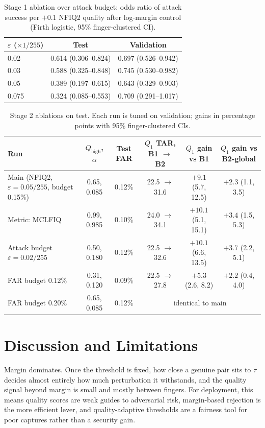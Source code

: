 \documentclass[10pt,twocolumn,letterpaper]{article}
\newcommand{\eps}{\varepsilon}
\begin{document}
\begin{table}[t]
\centering\footnotesize\setlength{\tabcolsep}{3pt}
\caption{Stage 1 ablation over attack budget: odds ratio of attack success per $+0.1$ NFIQ2 quality after log-margin control (Firth logistic, 95\% finger-clustered CI).}
\label{tab:epsabl}
\begin{tabular}{lcc}
\toprule
$\eps$ ($\times 1/255$) & Test & Validation \\
\midrule
0.02 & 0.614 (0.306--0.824) & 0.697 (0.526--0.942) \\
0.03 & 0.588 (0.325--0.848) & 0.745 (0.530--0.982) \\
0.05 & 0.389 (0.197--0.615) & 0.643 (0.329--0.903) \\
0.075 & 0.324 (0.085--0.553) & 0.709 (0.291--1.017) \\
\bottomrule
\end{tabular}
\end{table}

\begin{table}[t]
\centering\footnotesize
\caption{Stage 2 ablations on test. Each run is tuned on validation; gains in percentage points with 95\% finger-clustered CIs.}
\label{tab:abl}
\setlength{\tabcolsep}{4pt}
\begin{tabular}{lccccc}
\toprule
Run & $Q_{\mathrm{high}}$, $\alpha$ & Test FAR & $Q_1$ TAR, B1 $\to$ B2 & $Q_1$ gain vs B1 & $Q_1$ gain vs B2-global \\
\midrule
Main (NFIQ2, $\eps = 0.05/255$, budget 0.15\%) & 0.65, 0.085 & 0.12\% & 22.5 $\to$ 31.6 & $+9.1$ (5.7, 12.5) & $+2.3$ (1.1, 3.5) \\
Metric: MCLFIQ & 0.99, 0.985 & 0.10\% & 24.0 $\to$ 34.1 & $+10.1$ (5.1, 15.1) & $+3.4$ (1.5, 5.3) \\
Attack budget $\eps = 0.02/255$ & 0.50, 0.180 & 0.12\% & 22.5 $\to$ 32.6 & $+10.1$ (6.6, 13.5) & $+3.7$ (2.2, 5.1) \\
FAR budget 0.12\% & 0.31, 0.120 & 0.09\% & 22.5 $\to$ 27.8 & $+5.3$ (2.6, 8.2) & $+2.2$ (0.4, 4.0) \\
FAR budget 0.20\% & 0.65, 0.085 & 0.12\% & \multicolumn{3}{c}{identical to main} \\
\bottomrule
\end{tabular}
\end{table}

\section{Discussion and Limitations}
Margin dominates. Once the threshold is fixed, how close a genuine pair sits to $\tau$ decides almost entirely how much perturbation it withstands, and the quality signal beyond margin is small and mostly between fingers. For deployment, this means quality scores are weak guides to adversarial risk, margin-based rejection is the more efficient lever, and quality-adaptive thresholds are a fairness tool for poor captures rather than a security gain.
\end{document}
